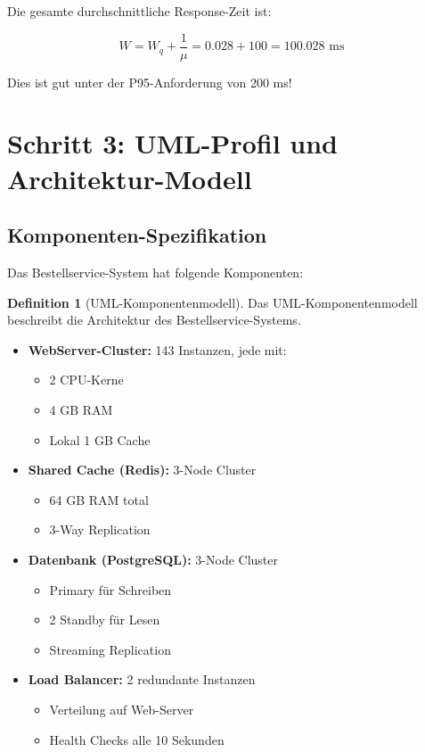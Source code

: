 \documentclass[a4paper,11pt]{article}
\theoremstyle{definition}
\newtheorem{definition}{Definition}
\begin{document}
Die gesamte durchschnittliche Response-Zeit ist:

\[
W = W_q + \frac{1}{\mu} = 0.028 + 100 = 100.028 \text{ ms}
\]

Dies ist gut unter der P95-Anforderung von 200 ms!

\section{Schritt 3: UML-Profil und Architektur-Modell}

\subsection{Komponenten-Spezifikation}

Das Bestellservice-System hat folgende Komponenten:

\begin{definition}[UML-Komponentenmodell] Das UML-Komponentenmodell beschreibt die Architektur des Bestellservice-Systems.
    \label{def:order_service_components}
    
    \begin{itemize}
        \item \textbf{WebServer-Cluster:} 143 Instanzen, jede mit:
            \begin{itemize}
                \item 2 CPU-Kerne
                \item 4 GB RAM
                \item Lokal 1 GB Cache
            \end{itemize}
        
        \item \textbf{Shared Cache (Redis):} 3-Node Cluster
            \begin{itemize}
                \item 64 GB RAM total
                \item 3-Way Replication
            \end{itemize}
        
        \item \textbf{Datenbank (PostgreSQL):} 3-Node Cluster
            \begin{itemize}
                \item Primary für Schreiben
                \item 2 Standby für Lesen
                \item Streaming Replication
            \end{itemize}
        
        \item \textbf{Load Balancer:} 2 redundante Instanzen
            \begin{itemize}
                \item Verteilung auf Web-Server
                \item Health Checks alle 10 Sekunden
            \end{itemize}
    \end{itemize}
\end{definition}
\end{document}
